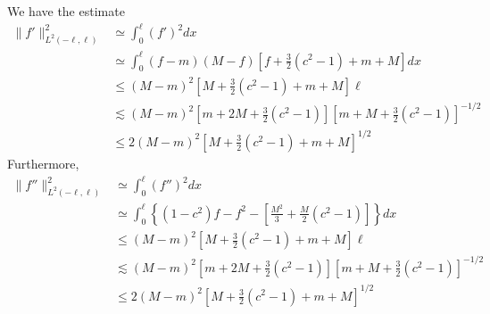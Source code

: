 \documentclass[12pt,reqno]{amsart}
\numberwithin{equation}{section}  %
\begin{document}
%
%
We have the estimate
%
%
\begin{equation*}
\begin{split}
  \| f' \|^{2}_{L^{2}(-\ell, \ell)}
  & \simeq \int_{0}^{\ell} (f')^{2} dx
  \\
  & \simeq \int_{0}^{\ell} (f-m)(M-f)\left[ f + \frac{3}{2}(c^{2}-1)+m + M
  \right]dx
  \\
  & \le (M-m)^{2} \left[ M + \frac{3}{2}(c^{2}-1) +m + M \right] \ell
  \\
  & \lesssim (M-m)^{2} \left[ m + 2M + \frac{3}{2}(c^{2}-1)  \right]
  \left[ m + M + \frac{3}{2}(c^{2}-1)\right]^{-1/2}
  \\
  & \le 2 (M-m)^{2}\left[ M + \frac{3}{2}(c^{2}-1) +m + M \right]^{1/2}
\end{split}
\end{equation*}
%
%
Furthermore,
\begin{equation*}
\begin{split}
  \| f'' \|^{2}_{L^{2}(-\ell, \ell)}
  & \simeq \int_{0}^{\ell} (f'')^{2} dx
  \\
  & \simeq \int_{0}^{\ell}
  \left\{ (1-c^{2})f - f^{2} - \left [\frac{M^{2}}{3} + \frac{M}{2}(c^{2}-1)
  \right] \right\}dx
  \\
  & \le (M-m)^{2} \left[ M + \frac{3}{2}(c^{2}-1) +m + M \right] \ell
  \\
  & \lesssim (M-m)^{2} \left[ m + 2M + \frac{3}{2}(c^{2}-1)  \right]
  \left[ m + M + \frac{3}{2}(c^{2}-1)\right]^{-1/2}
  \\
  & \le 2 (M-m)^{2}\left[ M + \frac{3}{2}(c^{2}-1) +m + M \right]^{1/2}
\end{split}
\end{equation*}


%
%
%
%
%
%
%
\end{document}
